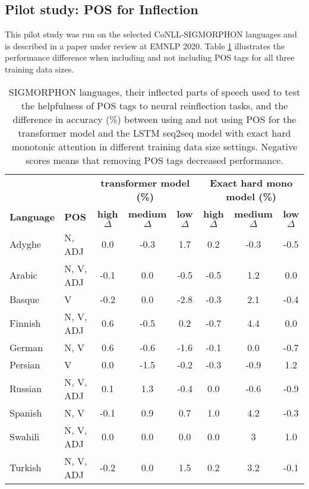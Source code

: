 \subsection{Pilot study: POS for Inflection}

This pilot study was run on the selected CoNLL-SIGMORPHON languages and is described in a paper under review at EMNLP 2020. 
Table \ref{tab:POSIGT2P} illustrates the performance difference when including and not including POS tags for all three training data sizes.

\begin{table}[h!]
    \centering
    \begin{tabular}{ll|ccc|ccc}
        & & \multicolumn{3}{c|}{\textbf{transformer model (\%)}} & \multicolumn{3}{|c}{\textbf{Exact hard mono model (\%)}} \\
        \cline{3-8}
       \textbf{Language} & \textbf{POS} & \textbf{high $\Delta$} & \textbf{medium $\Delta$} & \textbf{low $\Delta$} & \textbf{high $\Delta$} & \textbf{medium $\Delta$} & \textbf{low $\Delta$} \\
      Adyghe  & N, ADJ & 0.0 & -0.3 & 1.7 & 0.2 & -0.3 & -0.5 \\
      Arabic & N, V, ADJ & -0.1 & 0.0 & -0.5 & -0.5 & 1.2 & 0.0 \\
      Basque &  V & -0.2 & 0.0 & -2.8 & -0.3 & 2.1 & -0.4 \\
      Finnish & N, V, ADJ & 0.6 & -0.5 & 0.2 & -0.7 & 4.4 & 0.0 \\
      German & N, V & 0.6 & -0.6 & -1.6 & -0.1 & 0.0 & -0.7 \\
      Persian & V & 0.0 & -1.5 & -0.2 & -0.3 & -0.9 & 1.2 \\
      Russian & N, V, ADJ & 0.1 & 1.3 & -0.4 & 0.0 & -0.6 & -0.9 \\
      Spanish & N, V & -0.1 & 0.9 & 0.7 & 1.0 & 4.2 & -0.3 \\
      Swahili & N, V, ADJ & 0.0 & 0.0 & 0.0 & 0.0 & 3 & 1.0 \\
      Turkish & N, V, ADJ & -0.2 & 0.0 & 1.5 & 0.2 & 3.2 & -0.1 \\
    \end{tabular}
    \caption[SIGMORPHON languages Reinflection with/out POS tags]{SIGMORPHON languages, their inflected parts of speech used to test the helpfulness of POS tags to neural reinflection tasks, and the difference in accuracy (\%) between using and not using POS for the transformer model and the LSTM seq2seq model with exact hard monotonic attention in different training data size settings. Negative scores means that removing POS tags decreased performance.}
    \label{tab:POSIGT2P}
\end{table}

